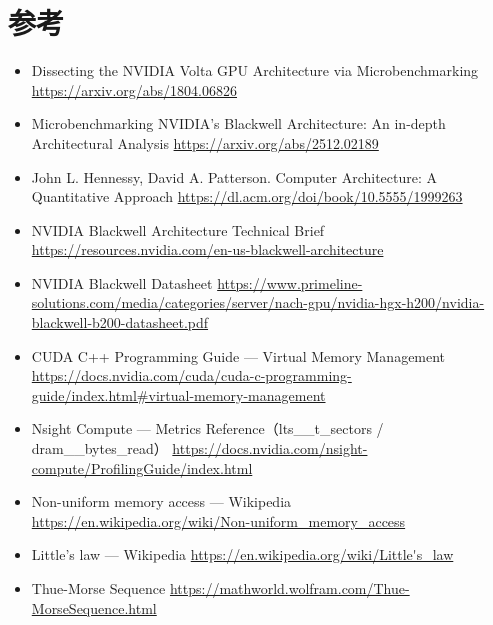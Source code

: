 \section{参考}

\begin{itemize}
  \item Dissecting the NVIDIA Volta GPU Architecture via Microbenchmarking \url{https://arxiv.org/abs/1804.06826}
  \item Microbenchmarking NVIDIA’s Blackwell Architecture: An in-depth Architectural Analysis \url{https://arxiv.org/abs/2512.02189}
  \item John L. Hennessy, David A. Patterson. Computer Architecture: A Quantitative Approach \url{https://dl.acm.org/doi/book/10.5555/1999263}
  \item NVIDIA Blackwell Architecture Technical Brief \url{https://resources.nvidia.com/en-us-blackwell-architecture}
  \item NVIDIA Blackwell Datasheet \url{https://www.primeline-solutions.com/media/categories/server/nach-gpu/nvidia-hgx-h200/nvidia-blackwell-b200-datasheet.pdf}
  \item CUDA C++ Programming Guide — Virtual Memory Management \url{https://docs.nvidia.com/cuda/cuda-c-programming-guide/index.html#virtual-memory-management}
  \item Nsight Compute — Metrics Reference（lts\_\_t\_sectors / dram\_\_bytes\_read） \url{https://docs.nvidia.com/nsight-compute/ProfilingGuide/index.html}
  \item Non-uniform memory access — Wikipedia \url{https://en.wikipedia.org/wiki/Non-uniform_memory_access}
  \item Little’s law — Wikipedia \url{https://en.wikipedia.org/wiki/Little's_law}
  \item Thue-Morse Sequence \url{https://mathworld.wolfram.com/Thue-MorseSequence.html}
\end{itemize}
